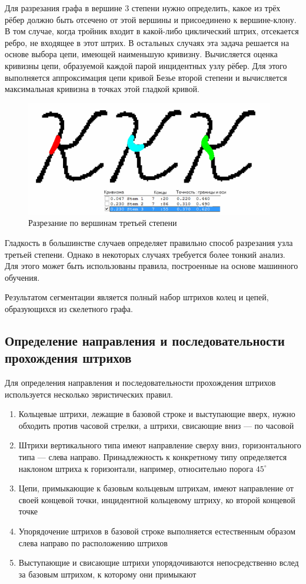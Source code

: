 \documentclass{article}
\begin{document}
    Для разрезания графа в вершине 3 степени нужно определить, какое из трёх рёбер должно быть отсечено от этой вершины и присоединено к вершине-клону. В том случае, когда тройник входит в какой-либо циклический штрих, отсекается ребро, не входящее в этот штрих. В остальных случаях эта задача решается на основе выбора цепи, имеющей наименьшую кривизну. Вычисляется оценка кривизны цепи, образуемой каждой парой инцидентных узлу рёбер. Для этого выполняется аппроксимация цепи кривой Безье второй степени и вычисляется максимальная кривизна в точках этой гладкой кривой.

    \begin{figure}[H]
    	\includegraphics[scale=0.9, height = 5cm]{img/mest7.png}
    	\centering
    	\caption{Разрезание по вершинам третьей степени}
    	\label{pic:17}
    \end{figure}

    Гладкость в большинстве случаев определяет правильно способ разрезания узла третьей степени. Однако в некоторых случаях требуется более тонкий анализ. Для этого может быть использованы правила, построенные на основе машинного обучения.

    Результатом сегментации является полный набор штрихов колец и цепей, образующихся из скелетного графа. 

\subsection{Определение направления и последовательности прохождения штрихов}

    Для определения направления и последовательности прохождения штрихов используется несколько эвристических правил.
    \begin{enumerate} 
        \item Кольцевые штрихи, лежащие в базовой строке и выступающие вверх, нужно обходить против часовой стрелки, а штрихи, свисающие вниз --- по часовой
        \item Штрихи вертикального типа имеют направление сверху вниз, горизонтального типа --- слева направо. Принадлежность к конкретному типу определяется наклоном штриха к горизонтали, например, относительно порога $45^{\circ}$
        \item Цепи, примыкающие к базовым кольцевым штрихам, имеют направление от своей концевой точки, инцидентной кольцевому штриху, ко второй концевой точке
        \item Упорядочение штрихов в базовой строке выполняется естественным образом слева направо по расположению штрихов
        \item Выступающие и свисающие штрихи упорядочиваются непосредственно вслед за базовым штрихом, к которому они примыкают
    \end{enumerate}
\end{document}
